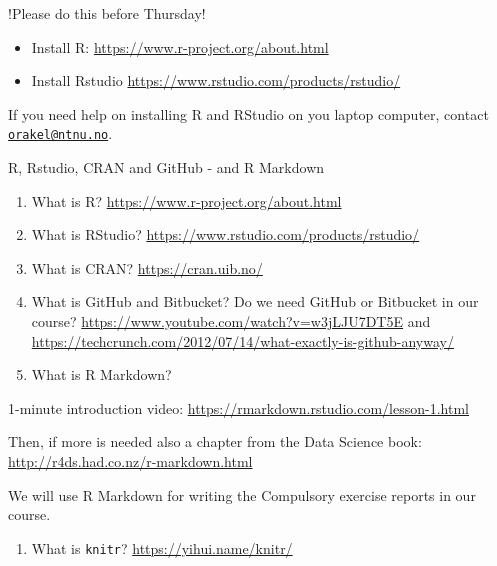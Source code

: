 \documentclass[ignorenonframetext,]{beamer}
\providecommand{\tightlist}{%
  \setlength{\itemsep}{0pt}\setlength{\parskip}{0pt}}
\begin{document}
\begin{frame}

\begin{block}{!Please do this before Thursday!}

\begin{itemize}
\item
  Install R: \url{https://www.r-project.org/about.html}
\item
  Install Rstudio \url{https://www.rstudio.com/products/rstudio/}
\end{itemize}

If you need help on installing R and RStudio on you laptop computer,
contact \href{mailto:orakel@ntnu.no}{\nolinkurl{orakel@ntnu.no}}.

\end{block}

\end{frame}

\begin{frame}[fragile]

\begin{block}{R, Rstudio, CRAN and GitHub - and R Markdown}

\begin{enumerate}
\def\labelenumi{\arabic{enumi})}
\item
  What is R? \url{https://www.r-project.org/about.html}
\item
  What is RStudio? \url{https://www.rstudio.com/products/rstudio/}
\item
  What is CRAN? \url{https://cran.uib.no/}
\item
  What is GitHub and Bitbucket? Do we need GitHub or Bitbucket in our
  course? \url{https://www.youtube.com/watch?v=w3jLJU7DT5E} and
  \url{https://techcrunch.com/2012/07/14/what-exactly-is-github-anyway/}
\item
  What is R Markdown?
\end{enumerate}

1-minute introduction video:
\url{https://rmarkdown.rstudio.com/lesson-1.html}

Then, if more is needed also a chapter from the Data Science book:
\url{http://r4ds.had.co.nz/r-markdown.html}

We will use R Markdown for writing the Compulsory exercise reports in
our course.

\begin{enumerate}
\def\labelenumi{\arabic{enumi})}
\setcounter{enumi}{5}
\tightlist
\item
  What is \texttt{knitr}? \url{https://yihui.name/knitr/}
\end{enumerate}

\end{block}

\end{frame}
\end{document}
